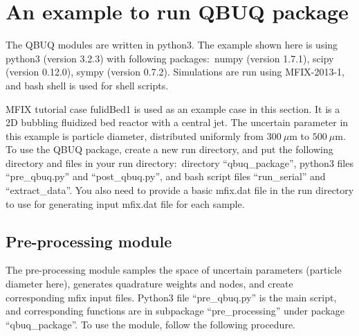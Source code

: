 \documentclass[a4paper,12pt,titlepage]{article}
\begin{document}
\section{An example to run QBUQ package}
\label{sec:ExampleQBUQ}
The QBUQ modules are written in python3. The example shown here is using
python3 (version 3.2.3) with following packages:\ numpy (version 1.7.1), scipy 
(version 0.12.0), sympy (version 0.7.2). Simulations are run using MFIX-2013-1, 
and bash shell is used for shell scripts.

MFIX tutorial case fulidBed1 is used as an example case in this section. It is 
a 2D bubbling fluidized bed reactor with a central jet. The uncertain parameter
in this example is particle diameter, distributed uniformly from 
$300\ \mu\textrm{m}$ to $500\ \mu\textrm{m}$. To use the QBUQ package, create a 
new run directory, and put the following directory and files in your run
directory:\ directory ``qbuq\_package'', python3 files ``pre\_qbuq.py'' and 
``post\_qbuq.py'', and bash script files ``run\_serial'' and ``extract\_data''. 
You also need to provide a basic mfix.dat file in the run directory to use 
for generating input mfix.dat file for each sample.

\subsection{Pre-processing module}
\label{sec:Pre-processing}
The pre-processing module samples the space of uncertain parameters (particle
diameter here), generates quadrature weights and nodes, and create corresponding
mfix input files. Python3 file ``pre\_qbuq.py'' is the main script, and 
corresponding functions are in subpackage ``pre\_processing'' under package 
``qbuq\_package''. To use the module, follow the following procedure.
\end{document}
